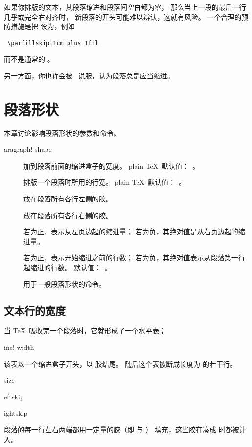\documentclass[a4paper]{rapport3}
\makeatletter
\newenvironment{inventory}{\begin{description}}{\end{description}}
\def\term#1\par{\index{#1}}
\def\cstoidx#1\par{\index{#1@\cs{#1}}}
\makeatother
\begin{document}
如果你排版的文本，其段落缩进和段落间空白都为零，
那么当上一段的最后一行几乎或完全右对齐时，
新段落的开头可能难以辨认，这就有风险。
一个合理的预防措施是把  设为，例如 \begin{verbatim}
 \parfillskip=1cm plus 1fil
\end{verbatim}
而不是通常的 。

另一方面，你也许会被~\cite{Tsch} 说服，认为段落总是应当缩进。

\endofchapter
\chapter{段落形状}\label{par:shape}

本章讨论影响段落形状的参数和命令。
\term paragraph! shape\par

\begin{inventory}
\item [] 
      加到段落前面的缩进盒子的宽度。
      plain \TeX\ 默认值：~\n{20pt}。

\item [] 
      排版一个段落时所用的行宽。
      plain \TeX\ 默认值：~\n{6.5in}。

\item [] 
      放在段落所有各行左侧的胶。


\item [] 
      放在段落所有各行右侧的胶。


\item []   
      若为正，表示从左页边起的缩进量；
      若为负，其绝对值是从右页边起的缩进量。

\item []   
      若为正，表示开始缩进之前的行数；
      若为负，其绝对值表示从段落第一行起缩进的行数。
      默认值：~。

\item []
      用于一般段落形状的命令。

\end{inventory}


\section{文本行的宽度}

当 \TeX\ 吸收完一个段落时，它就形成了一个水平表；
\term line! width\par
该表以一个缩进盒子开头，以  胶结尾。
随后这个表被断成长度为  的若干行。
\cstoidx hsize\par\cstoidx leftskip\par\cstoidx rightskip\par
段落的每一行左右两端都用一定量的胶（即  与 ）
填充，这些胶在凑成  时都被计入。
\end{document}
